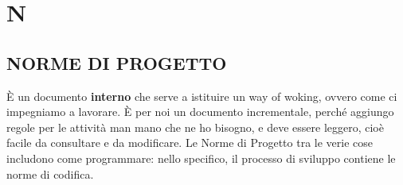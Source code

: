 \newpage
	\section{N} \label{sec:N}
	
		\subsection{NORME DI PROGETTO}	 \label{norme}
		È un documento \textbf{interno} che serve a istituire un way of woking, ovvero come ci impegniamo a lavorare. È per noi un documento incrementale, perché aggiungo regole per le attività man mano che ne ho bisogno, e deve essere leggero, cioè facile da consultare e da modificare.
		Le Norme di Progetto tra le verie cose includono come programmare: nello specifico, il processo di sviluppo contiene le norme di codifica.
		
		
